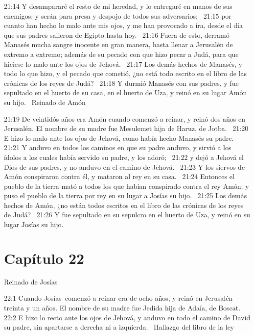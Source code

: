 21:14 Y desampararé el resto de mi heredad, y lo entregaré en manos de sus enemigos; y serán para presa y despojo de todos sus adversarios;  
21:15 por cuanto han hecho lo malo ante mis ojos, y me han provocado a ira, desde el día que sus padres salieron de Egipto hasta hoy.  
21:16 Fuera de esto, derramó Manasés mucha sangre inocente en gran manera, hasta llenar a Jerusalén de extremo a extremo; además de su pecado con que hizo pecar a Judá, para que hiciese lo malo ante los ojos de Jehová.  
21:17 Los demás hechos de Manasés, y todo lo que hizo, y el pecado que cometió, ¿no está todo escrito en el libro de las crónicas de los reyes de Judá?  
21:18 Y durmió Manasés con sus padres, y fue sepultado en el huerto de su casa, en el huerto de Uza, y reinó en su lugar Amón su hijo.  
Reinado de Amón  

21:19 De veintidós años era Amón cuando comenzó a reinar, y reinó dos años en Jerusalén. El nombre de su madre fue Mesulemet hija de Haruz, de Jotba.  
21:20 E hizo lo malo ante los ojos de Jehová, como había hecho Manasés su padre.  
21:21 Y anduvo en todos los caminos en que su padre anduvo, y sirvió a los ídolos a los cuales había servido su padre, y los adoró;  
21:22 y dejó a Jehová el Dios de sus padres, y no anduvo en el camino de Jehová.  
21:23 Y los siervos de Amón conspiraron contra él, y mataron al rey en su casa.  
21:24 Entonces el pueblo de la tierra mató a todos los que habían conspirado contra el rey Amón; y puso el pueblo de la tierra por rey en su lugar a Josías su hijo.  
21:25 Los demás hechos de Amón, ¿no están todos escritos en el libro de las crónicas de los reyes de Judá?  
21:26 Y fue sepultado en su sepulcro en el huerto de Uza, y reinó en su lugar Josías su hijo.  
\section*{Capítulo 22 }
Reinado de Josías  


22:1 Cuando Josías comenzó a reinar era de ocho años, y reinó en Jerusalén treinta y un años. El nombre de su madre fue Jedida hija de Adaía, de Boscat.  
22:2 E hizo lo recto ante los ojos de Jehová, y anduvo en todo el camino de David su padre, sin apartarse a derecha ni a izquierda.  
Hallazgo del libro de la ley  

